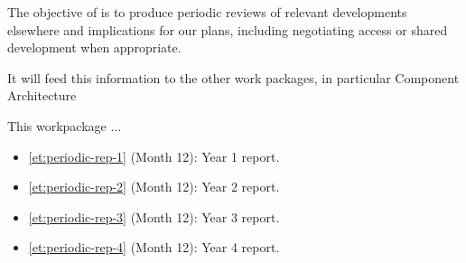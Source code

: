 \addtocounter{wpno}{1}
\begin{Workpackage}{\thewpno}
\WPTitle{\wpname{\thewpno}}

\begin{WPObjectives}
  The objective of \theWP{} is to produce periodic reviews of relevant
  developments elsewhere and implications for our plans, including
  negotiating access or shared development when appropriate.

  It will feed this information to the other work packages, in
  particular Component Architecture
\end{WPObjectives}

\begin{WPDescription}
This workpackage  ...
\end{WPDescription}

\begin{WPDeliverables}
\begin{itemize}
\item
\ref{et:periodic-rep-1}
(Month 12): Year 1 report.
\item
\ref{et:periodic-rep-2}
(Month 12): Year 2 report.
\item
\ref{et:periodic-rep-3}
(Month 12): Year 3 report.
\item
\ref{et:periodic-rep-4}
(Month 12): Year 4 report.
\end{itemize}
\end{WPDeliverables}
\end{Workpackage}

